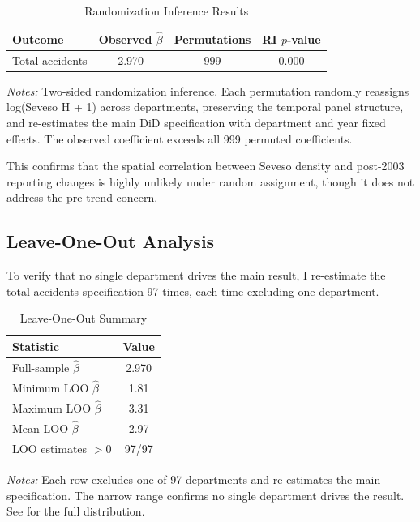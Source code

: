 \documentclass[12pt]{article}
\begin{document}
\begin{table}[H]
\centering
\caption{Randomization Inference Results}
\label{tab:ri}
\begin{tabular}{lccc}
\toprule
Outcome & Observed $\hat{\beta}$ & Permutations & RI $p$-value \\
\midrule
Total accidents & 2.970 & 999 & 0.000 \\
\bottomrule
\end{tabular}
\par\vspace{0.3em}
{\footnotesize \textit{Notes:} Two-sided randomization inference. Each permutation randomly reassigns log(Seveso H + 1) across departments, preserving the temporal panel structure, and re-estimates the main DiD specification with department and year fixed effects. The observed coefficient exceeds all 999 permuted coefficients.}
\end{table}

This confirms that the spatial correlation between Seveso density and post-2003 reporting changes is highly unlikely under random assignment, though it does not address the pre-trend concern.

\subsection{Leave-One-Out Analysis}

To verify that no single department drives the main result, I re-estimate the total-accidents specification 97 times, each time excluding one department.

\begin{table}[H]
\centering
\caption{Leave-One-Out Summary}
\label{tab:loo}
\begin{tabular}{lc}
\toprule
Statistic & Value \\
\midrule
Full-sample $\hat{\beta}$ & 2.970 \\
Minimum LOO $\hat{\beta}$ & 1.81 \\
Maximum LOO $\hat{\beta}$ & 3.31 \\
Mean LOO $\hat{\beta}$ & 2.97 \\
LOO estimates $> 0$ & 97/97 \\
\bottomrule
\end{tabular}
\par\vspace{0.3em}
{\footnotesize \textit{Notes:} Each row excludes one of 97 departments and re-estimates the main specification. The narrow range confirms no single department drives the result. See  for the full distribution.}
\end{table}
\end{document}
